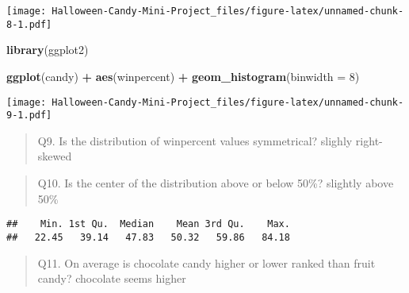 \documentclass[
]{article}
\newenvironment{Shaded}{\begin{snugshade}}{\end{snugshade}}
\newcommand{\AttributeTok}[1]{\textcolor[rgb]{0.13,0.29,0.53}{#1}}
\newcommand{\CommentTok}[1]{\textcolor[rgb]{0.56,0.35,0.01}{\textit{#1}}}
\newcommand{\DecValTok}[1]{\textcolor[rgb]{0.00,0.00,0.81}{#1}}
\newcommand{\FunctionTok}[1]{\textcolor[rgb]{0.13,0.29,0.53}{\textbf{#1}}}
\newcommand{\NormalTok}[1]{#1}
\newcommand{\SpecialCharTok}[1]{\textcolor[rgb]{0.81,0.36,0.00}{\textbf{#1}}}
\newcommand{\StringTok}[1]{\textcolor[rgb]{0.31,0.60,0.02}{#1}}
\begin{document}
\begin{Shaded}
\end{Shaded}

\texttt{[image: Halloween-Candy-Mini-Project\_files/figure-latex/unnamed-chunk-8-1.pdf]}

\begin{Shaded}
\begin{Highlighting}[]
\FunctionTok{library}\NormalTok{(ggplot2)}

\FunctionTok{ggplot}\NormalTok{(candy) }\SpecialCharTok{+}
  \FunctionTok{aes}\NormalTok{(winpercent) }\SpecialCharTok{+}
  \FunctionTok{geom\_histogram}\NormalTok{(}\AttributeTok{binwidth =} \DecValTok{8}\NormalTok{) }
\end{Highlighting}
\end{Shaded}

\texttt{[image: Halloween-Candy-Mini-Project\_files/figure-latex/unnamed-chunk-9-1.pdf]}

\begin{quote}
Q9. Is the distribution of winpercent values symmetrical? slighly
right-skewed
\end{quote}

\begin{quote}
Q10. Is the center of the distribution above or below 50\%? slightly
above 50\%
\end{quote}

\begin{Shaded}
\end{Shaded}

\begin{verbatim}
##    Min. 1st Qu.  Median    Mean 3rd Qu.    Max. 
##   22.45   39.14   47.83   50.32   59.86   84.18
\end{verbatim}

\begin{quote}
Q11. On average is chocolate candy higher or lower ranked than fruit
candy? chocolate seems higher
\end{quote}
\end{document}
